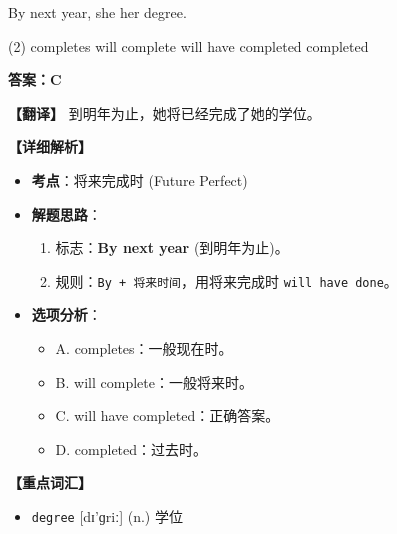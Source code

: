 \documentclass[11pt, a4paper]{article}
\newcommand{\analysis}[4]{
    \begin{solutionbox}
        \textbf{答案：#1}
        
        \textbf{【翻译】} #2
        
        \textbf{【详细解析】}
        #3
        
        \textbf{【重点词汇】}
        #4
    \end{solutionbox}
}
\newcommand{\blank}{\underline{\hspace{1.5cm}}}
\begin{document}
\begin{questions}
    \item By next year, she \blank her degree.
    \begin{tasks}(2)
        \task completes \task will complete
        \task will have completed \task completed
    \end{tasks}
    \analysis{C}{到明年为止，她将已经完成了她的学位。}{
        \begin{itemize}
            \item \textbf{考点}：将来完成时 (Future Perfect)
            \item \textbf{解题思路}：
                \begin{enumerate}
                    \item 标志：\textbf{By next year} (到明年为止)。
                    \item 规则：\texttt{By + 将来时间}，用将来完成时 \texttt{will have done}。
                \end{enumerate}
            \item \textbf{选项分析}：
                \begin{itemize}
                    \item A. completes：一般现在时。
                    \item B. will complete：一般将来时。
                    \item C. will have completed：正确答案。
                    \item D. completed：过去时。
                \end{itemize}
        \end{itemize}
    }{
        \begin{itemize}
            \item \texttt{degree} [dɪ'ɡriː] (n.) 学位
        \end{itemize}
    }


\end{questions}
\end{document}
